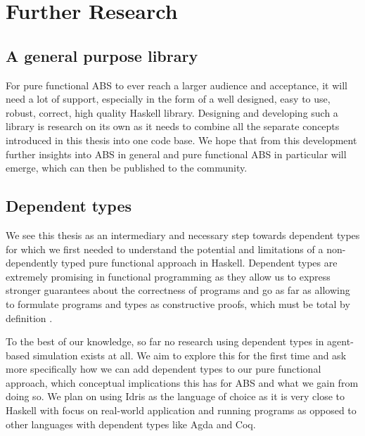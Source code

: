 \section{Further Research}
\subsection{A general purpose library}
For pure functional ABS to ever reach a larger audience and acceptance, it will need a lot of support, especially in the form of a well designed, easy to use, robust, correct, high quality Haskell library. Designing and developing such a library is research on its own as it needs to combine all the separate concepts introduced in this thesis into one code base. We hope that from this development further insights into ABS in general and pure functional ABS in particular will emerge, which can then be published to the community.


\subsection{Dependent types}
We see this thesis as an intermediary and necessary step towards dependent types for which we first needed to understand the potential and limitations of a non-dependently typed pure functional approach in Haskell. Dependent types are extremely promising in functional programming as they allow us to express stronger guarantees about the correctness of programs and go as far as allowing to formulate programs and types as constructive proofs, which must be total by definition \cite{altenkirch_pi_2010, altenkirch_why_2005, thompson_type_1991}.

To the best of our knowledge, so far no research using dependent types in agent-based simulation exists at all. We aim to explore this for the first time and ask more specifically how we can add dependent types to our pure functional approach, which conceptual implications this has for ABS and what we gain from doing so. We plan on using Idris \cite{brady_idris_2013} as the language of choice as it is very close to Haskell with focus on real-world application and running programs as opposed to other languages with dependent types like Agda and Coq.

